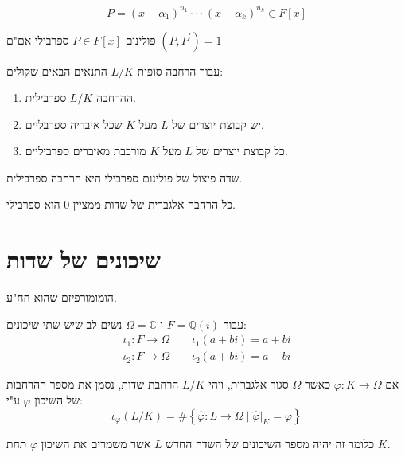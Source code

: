 \documentclass{tstextbook}
\begin{document}
\begin{corollary}
$$P=(x-\alpha_{1})^{n_{1}}\cdot\cdot\cdot(x-\alpha_{k})^{n_{k}}\in F[x]$$

\end{corollary}
\begin{proposition}
פולינום \(P \in F[x]\) ספרבילי אם"ם \((P,P^{\prime})=1\)

\end{proposition}
\begin{proposition}
עבור הרחבה סופית \(L / K\) התנאים הבאים שקולים:

  \begin{enumerate}
    \item ההרחבה \(L / K\) ספרבילית. 


    \item יש קבוצת יוצרים של \(L\) מעל \(K\) שכל איבריה ספרבליים. 


    \item כל קבוצת יוצרים של \(L\) מעל \(K\) מורכבת מאיברים ספרביליים. 


  \end{enumerate}
\end{proposition}
\begin{corollary}
שדה פיצול של פולינום ספרבילי היא הרחבה ספרבילית.

\end{corollary}
\begin{proposition}
כל הרחבה אלגברית של שדות ממציין 0 הוא ספרבילי.

\end{proposition}
\section{שיכונים של שדות}

\begin{definition}
הומומורפיזם שהוא חח"ע.

\end{definition}
\begin{example}
עבור \(F=\mathbb{Q}(i)\) ו-\(\Omega=\mathbb{C}\) נשים לב שיש שתי שיכונים:
\begin{gather*}\iota_{1}:F\to \Omega \qquad \iota_{1}(a+bi)=a+bi  \\\iota_{2}:F\to \Omega \qquad \iota_{2}(a+bi)=a-bi
\end{gather*}

\end{example}
\begin{definition}
אם \(\varphi :K\to \Omega\) כאשר \(\Omega\) סגור אלגברית, ויהי \(L / K\) הרחבת שדות, נסמן את מספר ההרחבות של השיכון \(\varphi\) ע"י:
$$\iota _{\varphi}( L / K) = \#\left\{  \widehat{\varphi}:L\to \Omega \mid \widehat{\varphi}|_{K}=\varphi  \right\}$$

\end{definition}
כלומר זה יהיה מספר השיכונים של השדה החדש \(L\) אשר משמרים את השיכון \(\varphi\) תחת \(K\).
\end{document}
